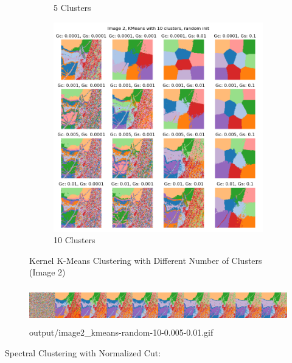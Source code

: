 \documentclass{homework}
\begin{document}
\begin{figure}[H]
\begin{subfigure}{0.32\textwidth}
        \caption{5 Clusters}
    \end{subfigure}
    \begin{subfigure}{0.32\textwidth}
        \centering
        \includegraphics[width=\textwidth]{output_grid/image2_kmeans-random-10.png}
        \caption{10 Clusters}
    \end{subfigure}
    \caption{Kernel K-Means Clustering with Different Number of Clusters (Image 2)}
\end{figure}

\begin{figure}[H]
    \centering
    \includegraphics[height=1.6cm]{output_flatgif/flatgif_image2_kmeans-random-10-0.005-0.01.png}
    \caption{output/image2\_kmeans-random-10-0.005-0.01.gif}
\end{figure}

Spectral Clustering with Normalized Cut:
\end{document}
